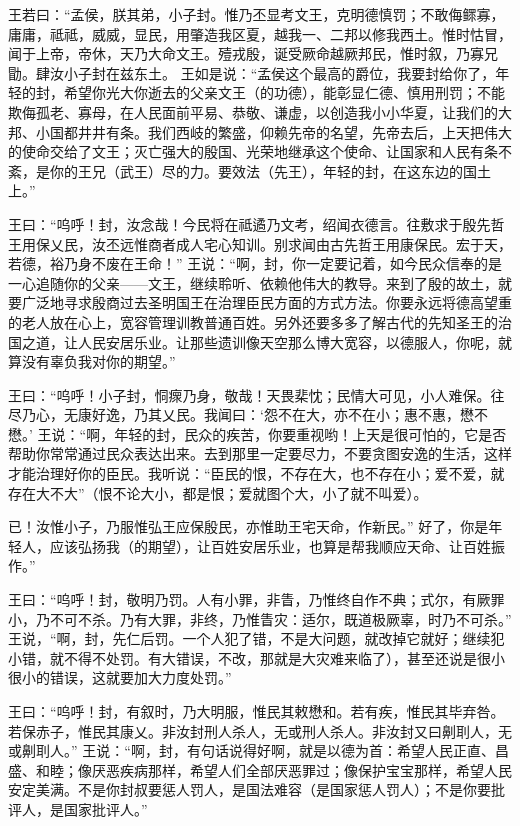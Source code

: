 \documentclass[12pt,UTF8]{ctexbook}
\begin{document}
王若曰：“孟侯，朕其弟，小子封。惟乃丕显考文王，克明德慎罚；不敢侮鳏寡，庸庸，祗祗，威威，显民，用肇造我区夏，越我一、二邦以修我西土。惟时怙冒，闻于上帝，帝休，天乃大命文王。殪戎殷，诞受厥命越厥邦民，惟时叙，乃寡兄勖。肆汝小子封在兹东土。
王如是说：“孟侯这个最高的爵位，我要封给你了，年轻的封，希望你光大你逝去的父亲文王（的功德），能彰显仁德、慎用刑罚；不能欺侮孤老、寡母，在人民面前平易、恭敬、谦虚，以创造我小小华夏，让我们的大邦、小国都井井有条。我们西岐的繁盛，仰赖先帝的名望，先帝去后，上天把伟大的使命交给了文王；灭亡强大的殷国、光荣地继承这个使命、让国家和人民有条不紊，是你的王兄（武王）尽的力。要效法（先王），年轻的封，在这东边的国土上。”

王曰：“呜呼！封，汝念哉！今民将在祗遹乃文考，绍闻衣德言。往敷求于殷先哲王用保乂民，汝丕远惟商者成人宅心知训。别求闻由古先哲王用康保民。宏于天，若德，裕乃身不废在王命！”
王说：“啊，封，你一定要记着，如今民众信奉的是一心追随你的父亲——文王，继续聆听、依赖他伟大的教导。来到了殷的故土，就要广泛地寻求殷商过去圣明国王在治理臣民方面的方式方法。你要永远将德高望重的老人放在心上，宽容管理训教普通百姓。另外还要多多了解古代的先知圣王的治国之道，让人民安居乐业。让那些遗训像天空那么博大宽容，以德服人，你呢，就算没有辜负我对你的期望。”

王曰：“呜呼！小子封，恫瘝乃身，敬哉！天畏棐忱；民情大可见，小人难保。往尽乃心，无康好逸，乃其乂民。我闻曰：‘怨不在大，亦不在小；惠不惠，懋不懋。’
王说：“啊，年轻的封，民众的疾苦，你要重视哟！上天是很可怕的，它是否帮助你常常通过民众表达出来。去到那里一定要尽力，不要贪图安逸的生活，这样才能治理好你的臣民。我听说：“臣民的恨，不存在大，也不存在小；爱不爱，就存在大不大”（恨不论大小，都是恨；爱就图个大，小了就不叫爱）。

已！汝惟小子，乃服惟弘王应保殷民，亦惟助王宅天命，作新民。”
好了，你是年轻人，应该弘扬我（的期望），让百姓安居乐业，也算是帮我顺应天命、让百姓振作。”

王曰：“呜呼！封，敬明乃罚。人有小罪，非眚，乃惟终自作不典；式尔，有厥罪小，乃不可不杀。乃有大罪，非终，乃惟眚灾：适尔，既道极厥辜，时乃不可杀。”
王说，“啊，封，先仁后罚。一个人犯了错，不是大问题，就改掉它就好；继续犯小错，就不得不处罚。有大错误，不改，那就是大灾难来临了），甚至还说是很小很小的错误，这就要加大力度处罚。”

王曰：“呜呼！封，有叙时，乃大明服，惟民其敕懋和。若有疾，惟民其毕弃咎。若保赤子，惟民其康乂。非汝封刑人杀人，无或刑人杀人。非汝封又曰劓刵人，无或劓刵人。”
王说：“啊，封，有句话说得好啊，就是以德为首：希望人民正直、昌盛、和睦；像厌恶疾病那样，希望人们全部厌恶罪过；像保护宝宝那样，希望人民安定美满。不是你封叔要惩人罚人，是国法难容（是国家惩人罚人）；不是你要批评人，是国家批评人。”
\end{document}
